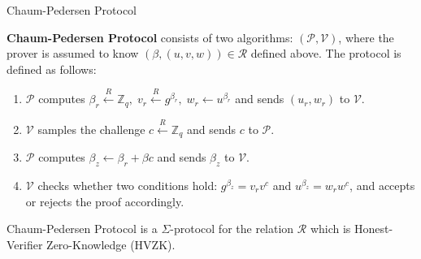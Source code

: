 \documentclass{zkdl-presentation-template}
\begin{document}
    \begin{frame}{Chaum-Pedersen Protocol}
        \begin{definition}
            \textbf{Chaum-Pedersen Protocol} consists of two algorithms: $(\mathcal{P}, \mathcal{V})$, where the prover is assumed to know $(\beta,(u,v,w)) \in \mathcal{R}$ defined above. The protocol is defined as follows:
            \begin{enumerate}
                \item $\mathcal{P}$ computes $\beta_r \xleftarrow{R} \mathbb{Z}_q, \; v_r \xleftarrow{R} g^{\beta_r}, \; w_r \gets u^{\beta_r}$ and sends $(u_r,w_r)$ to $\mathcal{V}$.
                \item $\mathcal{V}$ samples the challenge $c \xleftarrow{R} \mathbb{Z}_q$ and sends $c$ to $\mathcal{P}$.
                \item $\mathcal{P}$ computes $\beta_z \gets \beta_r + \beta c$ and sends $\beta_z$ to $\mathcal{V}$.
                \item $\mathcal{V}$ checks whether two conditions hold: $g^{\beta_z} = v_rv^c$ and $u^{\beta_z} = w_r w^c$, and accepts or rejects the proof accordingly.
            \end{enumerate}
        \end{definition}
        
        \begin{theorem}
            Chaum-Pedersen Protocol is a $\Sigma$-protocol for the relation $\mathcal{R}$ which is Honest-Verifier Zero-Knowledge (HVZK).
        \end{theorem}
    \end{frame}
\end{document}
